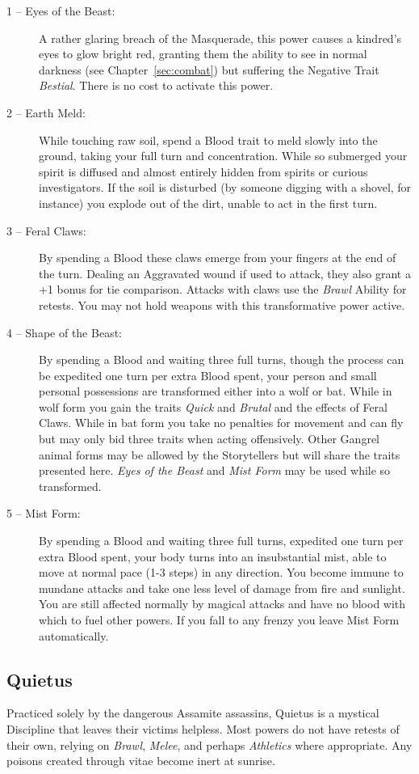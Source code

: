 \begin{description}
	\item[1 -- Eyes of the Beast:]  A rather glaring breach of the Masquerade, this power causes a kindred's 
	eyes to glow bright red, granting them the ability to see in normal darkness (see Chapter~\ref{sec:combat}) 
	but suffering the Negative Trait \emph{Bestial}.  There is no cost to activate this power.
	\item[2 -- Earth Meld:]  While touching raw soil, spend a Blood trait to meld slowly into the ground, 
	taking your full turn and concentration.  While so submerged your spirit is diffused and almost entirely
	hidden from spirits or curious investigators.  If the soil is disturbed (by someone digging with a shovel, 
	for instance) you explode out of the dirt, unable to act in the first turn.
	\item[3 -- Feral Claws:]  By spending a Blood these claws emerge from your fingers at the end of the turn.  
	Dealing an Aggravated wound if used to attack, they also grant a +1 bonus for tie comparison.  Attacks 
	with claws use the \emph{Brawl} Ability for retests.  You may not hold weapons with this transformative power 
	active.
	\item[4 -- Shape of the Beast:]  By spending a Blood and waiting three full turns, though the process can be 
	expedited one turn per extra Blood spent, your person and small personal possessions are transformed either 
	into a wolf or bat.  While in wolf form you gain the traits \emph{Quick} and \emph{Brutal} and the effects 
	of Feral Claws.  While in bat form you take no penalties for movement and can fly but may only bid three 
	traits when acting offensively.  Other Gangrel animal forms may be allowed by the Storytellers but will 
	share the traits presented here.  \emph{Eyes of the Beast} and \emph{Mist Form} may be used while so transformed.
	\item[5 -- Mist Form:]  By spending a Blood and waiting three full turns, expedited one turn per extra 
	Blood spent, your body turns into an insubstantial mist, able to move at normal pace (1-3 steps) in any direction.  
	You become immune to mundane attacks and take one less level of damage from fire and sunlight.  You are still 
	affected normally by magical attacks and have no blood with which to fuel other powers.  If you fall to any frenzy 
	you leave Mist Form automatically.
\end{description}

\subsection{Quietus}
Practiced solely by the dangerous Assamite assassins, Quietus is a mystical Discipline that leaves their victims 
helpless.  Most powers do not have retests of their own, relying on \emph{Brawl}, \emph{Melee}, and perhaps 
\emph{Athletics} where appropriate.  Any poisons created through vitae become inert at sunrise.

